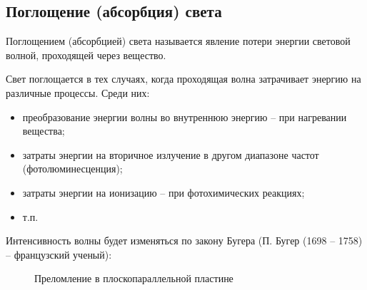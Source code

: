 \documentclass[12pt,a4paper,draft]{article}
\begin{document}
    \subsection{Поглощение (абсорбция) света}
    Поглощением (абсорбцией) света называется явление потери энергии световой волной, проходящей через вещество.

    Свет поглощается в тех случаях, когда проходящая волна затрачивает энергию на различные процессы. Среди них:
    \begin{itemize}
        \item преобразование энергии волны во внутреннюю энергию – при нагревании вещества;
        \item затраты энергии на вторичное излучение в другом диапазоне частот (фотолюминесценция);
        \item затраты энергии на ионизацию – при фотохимических реакциях;
        \item т.п.
    \end{itemize}

    Интенсивность волны будет изменяться по закону Бугера (П. Бугер (1698 – 1758) – французский ученый):




    \begin{figure}[H]%
            \noindent{}
            \caption{Преломление в плоскопараллельной пластине}
        \end{figure}
\end{document}
